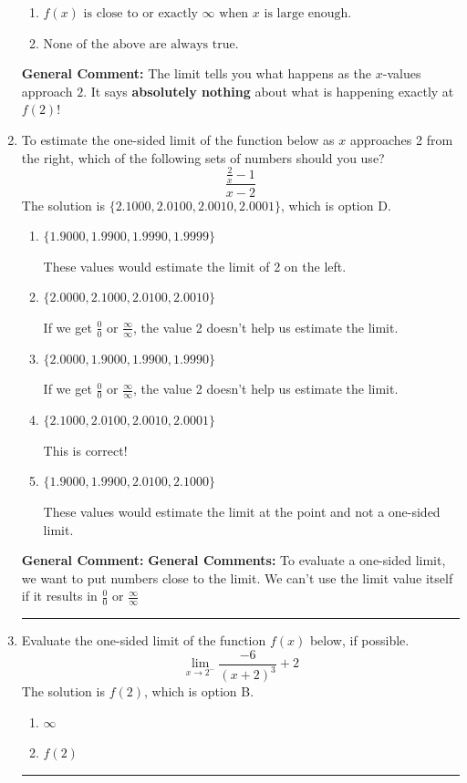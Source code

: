 \documentclass{extbook}[14pt]
\newcommand{\litem}[1]{\item #1

\rule{\textwidth}{0.4pt}}
\begin{document}
\begin{enumerate}
{\begin{enumerate}[label=\Alph*.]
\item \( f(x) \text{ is close to or exactly } \infty \text{ when } x \text{ is large enough}. \)


\item \( \text{None of the above are always true.} \)


\end{enumerate}

\textbf{General Comment:} The limit tells you what happens as the $x$-values approach $2$. It says \textbf{absolutely nothing} about what is happening exactly at $f(2)$!
}
\litem{
To estimate the one-sided limit of the function below as $x$ approaches 2 from the right, which of the following sets of numbers should you use?
\[ \frac{\frac{2}{x} - 1}{x - 2} \]The solution is \( \{ 2.1000, 2.0100, 2.0010, 2.0001 \} \), which is option D.\begin{enumerate}[label=\Alph*.]
\item \( \{ 1.9000, 1.9900, 1.9990, 1.9999 \} \)

These values would estimate the limit of 2 on the left.
\item \( \{ 2.0000, 2.1000, 2.0100, 2.0010 \} \)

If we get $\frac{0}{0}$ or $\frac{\infty}{\infty}$, the value 2 doesn't help us estimate the limit.
\item \( \{ 2.0000, 1.9000, 1.9900, 1.9990 \} \)

If we get $\frac{0}{0}$ or $\frac{\infty}{\infty}$, the value 2 doesn't help us estimate the limit.
\item \( \{ 2.1000, 2.0100, 2.0010, 2.0001 \} \)

This is correct!
\item \( \{ 1.9000, 1.9900, 2.0100, 2.1000 \} \)

These values would estimate the limit at the point and not a one-sided limit.
\end{enumerate}

\textbf{General Comment:} \textbf{General Comments:} To evaluate a one-sided limit, we want to put numbers close to the limit. We can't use the limit value itself if it results in $\frac{0}{0}$ or $\frac{\infty}{\infty}$
}
\litem{
Evaluate the one-sided limit of the function $f(x)$ below, if possible.
\[ \lim_{x \rightarrow 2^-} \frac{-6}{(x+2)^3}+2 \]The solution is \( f(2) \), which is option B.\begin{enumerate}[label=\Alph*.]
\item \( \infty \)


\item \( f(2) \)



\end{enumerate}}
\end{enumerate}
\end{document}

